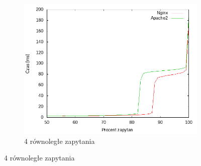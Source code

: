 \begin{figure}
\begin{subfigure}[h]{0.3\textwidth}
		\includegraphics[width=\textwidth]{testy/wybor_fib_5_4.png}
		\caption{4 równoległe zapytania}
	\end{subfigure}


\end{figure}
